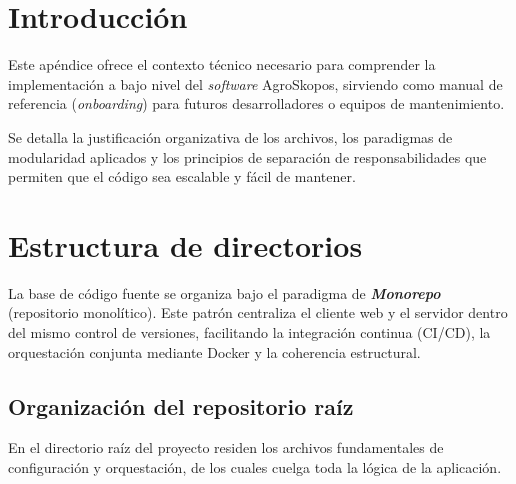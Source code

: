 
\section{Introducción}
Este apéndice ofrece el contexto técnico necesario para comprender la implementación a bajo nivel del \textit{software} AgroSkopos, sirviendo como manual de referencia (\textit{onboarding}) para futuros desarrolladores o equipos de mantenimiento. 

Se detalla la justificación organizativa de los archivos, los paradigmas de modularidad aplicados y los principios de separación de responsabilidades que permiten que el código sea escalable y fácil de mantener.

\section{Estructura de directorios}
La base de código fuente se organiza bajo el paradigma de \textbf{\textit{Monorepo}}~\cite{monorepo} (repositorio monolítico). Este patrón centraliza el cliente web y el servidor dentro del mismo control de versiones, facilitando la integración continua (CI/CD), la orquestación conjunta mediante Docker y la coherencia estructural.

\subsection{Organización del repositorio raíz}
En el directorio raíz del proyecto residen los archivos fundamentales de configuración y orquestación, de los cuales cuelga toda la lógica de la aplicación.

{\footnotesize
{}}

